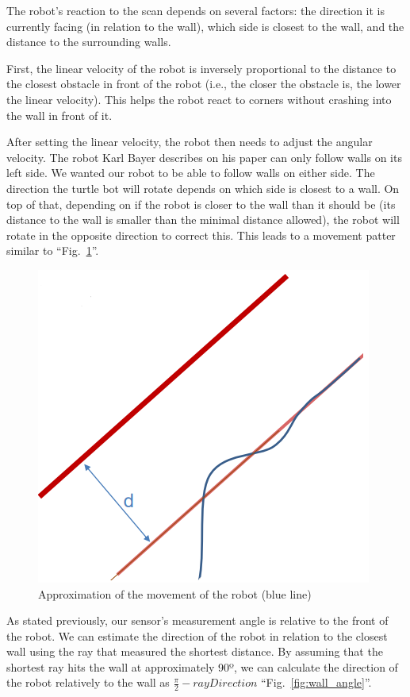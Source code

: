 \documentclass[conference]{IEEEtran}
\begin{document}
The robot's reaction to the scan depends on several factors: the direction it is currently facing (in relation to the wall), which side is closest to the wall, and the distance to the surrounding walls.

First, the linear velocity of the robot is inversely proportional to the distance to the closest obstacle in front of the robot (i.e., the closer the obstacle is, the lower the linear velocity). This helps the robot react to corners without crashing into the wall in front of it.

After setting the linear velocity, the robot then needs to adjust the angular velocity. The robot Karl Bayer describes on his paper can only follow walls on its left side. We wanted our robot to be able to follow walls on either side. The direction the turtle bot will rotate depends on which side is closest to a wall. On top of that, depending on if the robot is closer to the wall than it should be (its distance to the wall is smaller than the minimal distance allowed), the robot will rotate in the opposite direction to correct this. This leads to a movement patter similar to ``Fig.~\ref{fig:robot_movement}''.

\begin{figure}[htbp]
    \centerline{\includegraphics[width=0.5\linewidth]{images/robot_movement.png}}
    \caption{Approximation of the movement of the robot (blue line) \cite{locomotion}}
    \label{fig:robot_movement}
\end{figure}

As stated previously, our sensor's measurement angle is relative to the front of the robot. We can estimate the direction of the robot in relation to the closest wall using the ray that measured the shortest distance. By assuming that the shortest ray hits the wall at approximately 90º, we can calculate the direction of the robot relatively to the wall as $\frac{\pi}{2} - rayDirection$ ``Fig.~\ref{fig:wall_angle}''.
\end{document}
